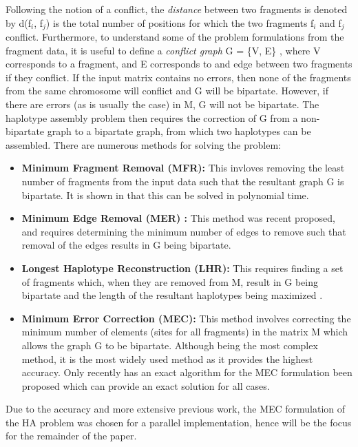 \documentclass[10pt,twocolumn]{article}
\begin{document}
Following the notion of a conflict, the \textit{distance} between two fragments is
denoted by d(f$_i$, f$_j$) is the total number of positions for which the two fragments f$_i$ and f$_j$
conflict. Furthermore, to understand some of the problem formulations from the fragment data, it is useful to
define a \textit{conflict graph} G = \{V, E\} \cite{lancia:2001}, where V corresponds to a fragment, and E
corresponds to and edge between two fragments if they conflict. If the input matrix contains no errors, then none
of the fragments from the same chromosome will conflict and G will be bipartate. However, if there are 
errors (as is usually the case) in M, G will not be bipartate. The haplotype assembly problem then requires 
the correction of G from a non-bipartate graph to a bipartate graph, from which two haplotypes can be
assembled. There are numerous methods for solving the problem:
\begin{itemize}[noitemsep]
    \item{ \textbf{Minimum Fragment Removal (MFR):} This invloves removing the least number of fragments 
            from the input data such that the resultant graph G is bipartate. It is shown in 
            \cite{lancia:2001} that this can be solved in polynomial time.
        }
\item{ \textbf{Minimum Edge Removal (MER) \cite{aguiar:2012}:} This method was recent proposed, and requires
        determining the minimum number of edges to remove such that removal of the edges results in G being 
        bipartate.
    }
\item{ \textbf{Longest Haplotype Reconstruction (LHR):} This requires finding a set of fragments which,
        when they are removed from M, result in G being bipartate and the length of the resultant 
        haplotypes being maximized \cite{schwartz:2010}. 
    }
\item{ \textbf{Minimum Error Correction (MEC):} This method involves correcting the minimum number of 
        elements (sites for all fragments) in the matrix M which allows the graph G to be bipartate. 
        Although being the most complex method, it is the most widely used method as it provides the 
        highest accuracy. Only recently has an exact algorithm for the MEC formulation been proposed which 
        can provide an exact solution for all cases.
    }
\end{itemize}
Due to the accuracy and more extensive previous work, the MEC formulation of the HA problem was chosen for a
parallel implementation, hence will be the focus for the remainder of the paper.
\end{document}
